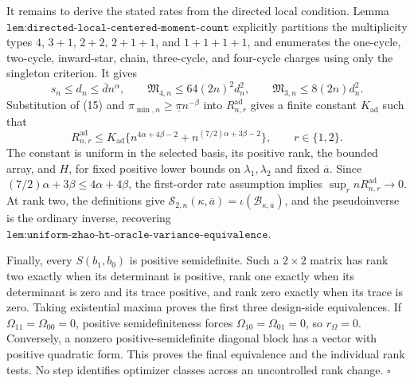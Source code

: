 It remains to derive the stated rates from the directed local condition.  Lemma \(\texttt{lem:directed-local-centered-moment-count}\) explicitly partitions the multiplicity types \(4\), \(3+1\), \(2+2\), \(2+1+1\), and \(1+1+1+1\), and enumerates the one-cycle, two-cycle, inward-star, chain, three-cycle, and four-cycle charges using only the singleton criterion.  It gives
\[
s_n\le d_n\le\overline d n^\alpha,
\qquad
\mathfrak M_{4,n}\le64(2n)^2d_n^2,
\qquad
\mathfrak M_{3,n}\le8(2n)d_n^2.
\tag{15}
\]
Substitution of (15) and \(\pi_{\min,n}\ge\underline\pi n^{-\beta}\) into \(R_{n,r}^{\mathrm{ad}}\) gives a finite constant \(K_{\mathrm{ad}}\) such that
\[
R_{n,r}^{\mathrm{ad}}
\le K_{\mathrm{ad}}
\{n^{4\alpha+4\beta-2}+n^{(7/2)\alpha+3\beta-2}\},
\qquad r\in\{1,2\}.
\tag{16}
\]
The constant is uniform in the selected basis, its positive rank, the bounded array, and \(H\), for fixed positive lower bounds on \(\lambda_1,\lambda_2\) and fixed \(\overline a\).  Since \((7/2)\alpha+3\beta\le4\alpha+4\beta\), the first-order rate assumption implies \(\sup_r nR_{n,r}^{\mathrm{ad}}\to0\).  At rank two, the definitions give \(\mathcal S_{2,n}(\kappa,\overline a)=\iota(\mathcal B_{\kappa,\overline a})\), and the pseudoinverse is the ordinary inverse, recovering \(\texttt{lem:uniform-zhao-ht-oracle-variance-equivalence}\).

Finally, every \(S(b_1,b_0)\) is positive semidefinite.  Such a \(2\times2\) matrix has rank two exactly when its determinant is positive, rank one exactly when its determinant is zero and its trace positive, and rank zero exactly when its trace is zero.  Taking existential maxima proves the first three design-side equivalences.  If \(\Omega_{11}=\Omega_{00}=0\), positive semidefiniteness forces \(\Omega_{10}=\Omega_{01}=0\), so \(r_\Omega=0\).  Conversely, a nonzero positive-semidefinite diagonal block has a vector with positive quadratic form.  This proves the final equivalence and the individual rank tests.  No step identifies optimizer classes across an uncontrolled rank change. \(\square\)